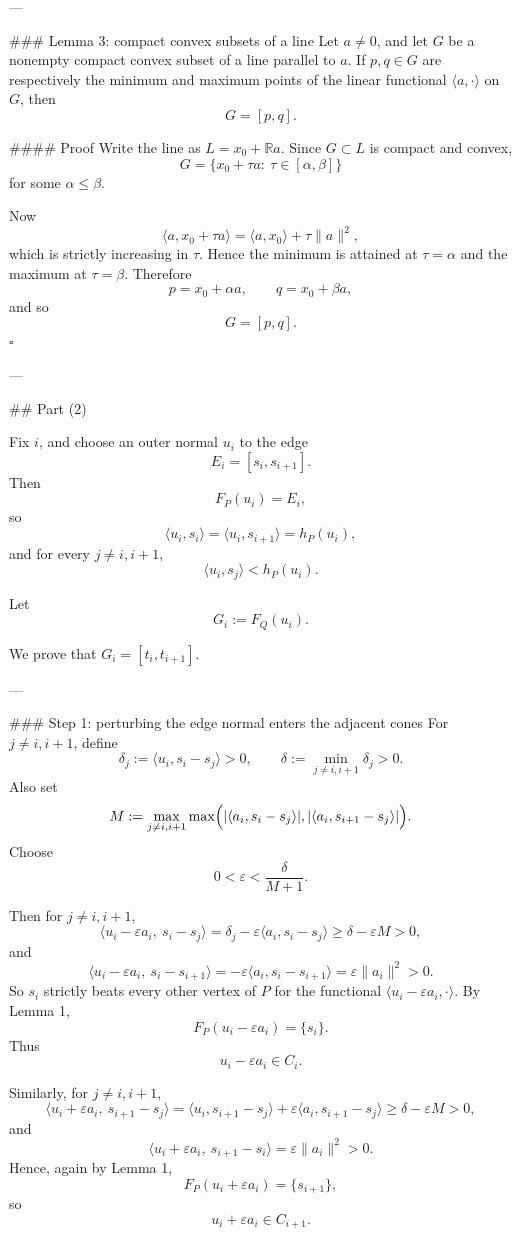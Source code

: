 ---

### Lemma 3: compact convex subsets of a line
Let \(a\neq 0\), and let \(G\) be a nonempty compact convex subset of a line parallel to \(a\).  
If \(p,q\in G\) are respectively the minimum and maximum points of the linear functional \(\langle a,\cdot\rangle\) on \(G\), then
\[
G=[p,q].
\]

#### Proof
Write the line as \(L=x_0+\mathbb{R}a\). Since \(G\subset L\) is compact and convex,
\[
G=\{x_0+\tau a:\ \tau\in [\alpha,\beta]\}
\]
for some \(\alpha\le \beta\).

Now
\[
\langle a, x_0+\tau a\rangle=\langle a,x_0\rangle+\tau\|a\|^2,
\]
which is strictly increasing in \(\tau\). Hence the minimum is attained at \(\tau=\alpha\) and the maximum at \(\tau=\beta\). Therefore
\[
p=x_0+\alpha a,\qquad q=x_0+\beta a,
\]
and so
\[
G=[p,q].
\]
\(\square\)

---

## Part (2)

Fix \(i\), and choose an outer normal \(u_i\) to the edge
\[
E_i=[s_i,s_{i+1}].
\]
Then
\[
F_P(u_i)=E_i,
\]
so
\[
\langle u_i,s_i\rangle=\langle u_i,s_{i+1}\rangle=h_P(u_i),
\]
and for every \(j\neq i,i+1\),
\[
\langle u_i,s_j\rangle<h_P(u_i).
\]

Let
\[
G_i:=F_Q(u_i).
\]

We prove that \(G_i=[t_i,t_{i+1}]\).

---

### Step 1: perturbing the edge normal enters the adjacent cones
For \(j\neq i,i+1\), define
\[
\delta_j:=\langle u_i,s_i-s_j\rangle>0,
\qquad
\delta:=\min_{j\neq i,i+1}\delta_j>0.
\]
Also set
\[
M:=\max_{j\neq i,i+1}\max\Bigl(
|\langle a_i,s_i-s_j\rangle|,
|\langle a_i,s_{i+1}-s_j\rangle|
\Bigr).
\]
Choose
\[
0<\varepsilon<\frac{\delta}{M+1}.
\]

Then for \(j\neq i,i+1\),
\[
\langle u_i-\varepsilon a_i,\ s_i-s_j\rangle
=\delta_j-\varepsilon\langle a_i,s_i-s_j\rangle
\ge \delta-\varepsilon M>0,
\]
and
\[
\langle u_i-\varepsilon a_i,\ s_i-s_{i+1}\rangle
=-\varepsilon\langle a_i,s_i-s_{i+1}\rangle
=\varepsilon\|a_i\|^2>0.
\]
So \(s_i\) strictly beats every other vertex of \(P\) for the functional \(\langle u_i-\varepsilon a_i,\cdot\rangle\). By Lemma 1,
\[
F_P(u_i-\varepsilon a_i)=\{s_i\}.
\]
Thus
\[
u_i-\varepsilon a_i\in C_i.
\]

Similarly, for \(j\neq i,i+1\),
\[
\langle u_i+\varepsilon a_i,\ s_{i+1}-s_j\rangle
=\langle u_i,s_{i+1}-s_j\rangle+\varepsilon\langle a_i,s_{i+1}-s_j\rangle
\ge \delta-\varepsilon M>0,
\]
and
\[
\langle u_i+\varepsilon a_i,\ s_{i+1}-s_i\rangle
=\varepsilon\|a_i\|^2>0.
\]
Hence, again by Lemma 1,
\[
F_P(u_i+\varepsilon a_i)=\{s_{i+1}\},
\]
so
\[
u_i+\varepsilon a_i\in C_{i+1}.
\]

